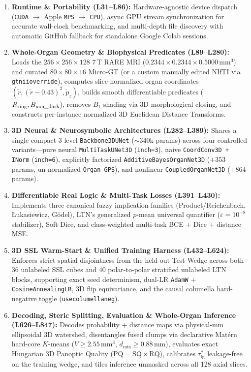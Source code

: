 \documentclass[10pt,a4paper]{article}
\renewcommand{\_}{\origunderscore\allowbreak}
\begin{document}
\begin{enumerate}
    \item \textbf{Runtime \& Portability (L31--L86):} Hardware-agnostic device dispatch (\texttt{CUDA} $\to$ Apple \texttt{MPS} $\to$ \texttt{CPU}), async GPU stream synchronization for accurate wall-clock benchmarking, and multi-depth file discovery with automatic GitHub fallback for standalone Google Colab sessions.
    \item \textbf{Whole-Organ Geometry \& Biophysical Predicates (L89--L280):} Loads the $256 \times 256 \times 128$ 7\,T RARE MRI ($0.2344 \times 0.2344 \times 0.5000\,\text{mm}^3$) and curated $80 \times 80 \times 16$ Micro-GT (or a custom manually edited NIfTI via \texttt{gt\_nii\_override}), computes slice-normalized organ coordinates $(\tilde{r}, (\tilde{r}-0.43)^2, \tilde{p}_z)$, builds smooth differentiable predicates ($R_{\text{ring}}, B_{\text{non\_dark}}$), removes $B_1$ shading via 3D morphological closing, and constructs per-instance normalized 3D Euclidean Distance Transforms.
    \item \textbf{3D Neural \& Neurosymbolic Architectures (L282--L389):} Shares a single compact 3-level \texttt{Backbone3DUNet} ($\sim 340\text{k}$ params) across four controlled variants---pure neural \texttt{MultiTaskUNet3D} (\texttt{in\_ch=3}), naive \texttt{CoordConv3D\,+\,INorm} (\texttt{in\_ch=6}), explicitly factorized \texttt{AdditiveBayesOrganNet3D} ($+353$ params, un-normalized \texttt{Organ-GPS}), and nonlinear \texttt{CoupledOrganNet3D} ($+864$ params).
    \item \textbf{Differentiable Real Logic \& Multi-Task Losses (L391--L430):} Implements three canonical fuzzy implication families (Product/Reichenbach, \L{}ukasiewicz, G\"odel), LTN's generalized $p$-mean universal quantifier ($\varepsilon = 10^{-8}$ stabilizer), Soft Dice, and class-weighted multi-task BCE + Dice + distance MSE.
    \item \textbf{3D SSL Warm-Start \& Unified Training Harness (L432--L624):} Enforces strict spatial disjointness from the held-out Test Wedge across both 36 unlabeled SSL cubes and 40 polar-to-polar stratified unlabeled LTN blocks, supporting exact seed determinism, dual-LR \texttt{AdamW} + \texttt{CosineAnnealingLR}, 3D flip equivariance, and the causal columella hard-negative toggle (\texttt{use\_columella\_neg}).
    \item \textbf{Decoding, Steric Splitting, Evaluation \& Whole-Organ Inference (L626--L847):} Decodes probability + distance maps via physical-mm ellipsoidal 3D watershed, disentangles fused clumps via declarative Mat\'ern hard-core $K$-means ($V \ge 2.55\,\text{mm}^3$, $d_{\min} \ge 0.88\,\text{mm}$), evaluates exact Hungarian 3D Panoptic Quality ($\text{PQ} = \text{SQ} \times \text{RQ}$), calibrates $\tau_{\text{fg}}^*$ leakage-free on the training wedge, and tiles inference unmasked across all 128 axial slices.
\end{enumerate}
\end{document}
